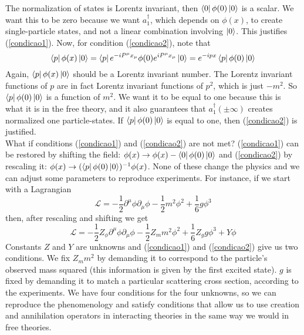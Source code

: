 The normalization of states is Lorentz invariant, then $\bra{0}\phi(0)\ket{0}$ is a scalar. We want this to be zero because we want $a_1^\dagger$, which  depends on $\phi(x)$, to create  single-particle states, and not a linear combination involving $\ket{0}$. This justifies (\ref{condicao1}). Now, for condition (\ref{condicao2}), note that
\begin{equation}
    \bra{p}\phi(x)\ket{0}=\bra{p}e^{-iP^\mu x_\mu}\phi(0)e^{iP^\mu x_\mu}\ket{0}=e^{-ipx}\bra{p}\phi(0)\ket{0}
\end{equation}
Again, $\bra{p}\phi(x)\ket{0}$ should be a Lorentz invariant number. The Lorentz invariant functions of $p$ are in fact Lorentz invariant functions of $p^2$, which is just $-m^2$. So $\bra{p}\phi(0)\ket{0}$ is a function of $m^2$. We want it to be equal to one because this is what it is in the free theory, and it also guarantees that $a_1^\dagger(\pm\infty)$ creates normalized one particle-states. If $\bra{p}\phi(0)\ket{0}$ is equal to one, then (\ref{condicao2}) is justified. \\

What if conditions (\ref{condicao1}) and (\ref{condicao2}) are not met?
(\ref{condicao1}) can be restored by shifting the field: $\phi(x)\to\phi(x)-\bra{0}\phi(0)\ket{0}$ and (\ref{condicao2})  by rescaling it: $\phi(x)\to(\bra{p}\phi(0)\ket{0})^{-1}\phi(x)$. None of these change the physics and we can adjust some parameters to reproduce experiments. For instance, if we start with a Lagrangian
\begin{equation}
   \mathcal{L}= -\frac{1}{2}\partial^\mu\phi\partial_\mu\phi-\frac{1}{2}m^2\phi^2+\frac{1}{6}g\phi^3
\end{equation}
then, after rescaling and shifting we get
\begin{equation}
      \mathcal{L}= -\frac{1}{2}Z_\phi\partial^\mu\phi\partial_\mu\phi-\frac{1}{2}Z_mm^2\phi^2+\frac{1}{6}Z_gg\phi^3+Y\phi
\end{equation}
Constants $Z$ and $Y$ are unknowns and (\ref{condicao1}) and (\ref{condicao2}) give us two conditions. We fix $Z_m m^2$ by demanding it to correspond to the particle's observed mass squared (this information is given by the first excited state). $g$ is fixed by demanding it to match a particular scattering cross section, according to the experiments. We have four conditions for the four unknowns, so we can reproduce the phenomenology and satisfy conditions that allow us to use creation and annihilation operators in interacting theories in the same way we would in free theories.\\

